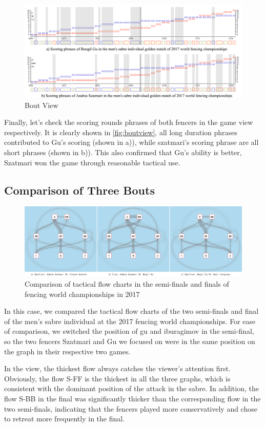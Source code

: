 \documentclass[journal]{vgtc}                %
\begin{document}
\begin{figure}[tb]
	\centering
	\includegraphics[width=\linewidth]{ScorePhrases}
	\caption{Bout View}
	\label{fig:boutview}
\end{figure}
Finally, let's check the scoring rounds phrases of both fencers in the game view respectively.
It is clearly shown in \autoref{fig:boutview},  all long duration phrases contributed to Gu's scoring (shown in a)), while szatmari's scoring phrase are all short phrases (shown in b)).
This also confirmed that Gu's ability is better, Szatmari won the game  through reasonable tactical use.


\subsection{Comparison of Three Bouts}
\begin{figure}[tb]
	\centering
	\includegraphics[width=\linewidth]{threeBout}
	\caption{Comparison of tactical flow charts in the semi-finals and finals of fencing world championships in 2017}
	\label{fig:sample}
\end{figure}
In this case, we compared the tactical flow charts of the two semi-finals and final of the men's sabre individual at the 2017 fencing world championships.
For ease of comparison, we switched the position of gu and iburagimov in the semi-final, so the two fencers Szatmari and Gu we focused on were in the same position on the graph in their respective two games.

In the view, the thickest flow always catches the viewer's attention first.
Obviously, the flow S-FF is the thickest in all the three graphs, which is consistent with the dominant position of the attack in the sabre.
In addition, the flow S-BB in the final was significantly thicker than the corresponding flow in the two semi-finals, indicating that the fencers played more conservatively and  chose to retreat more frequently in the final.
\end{document}
